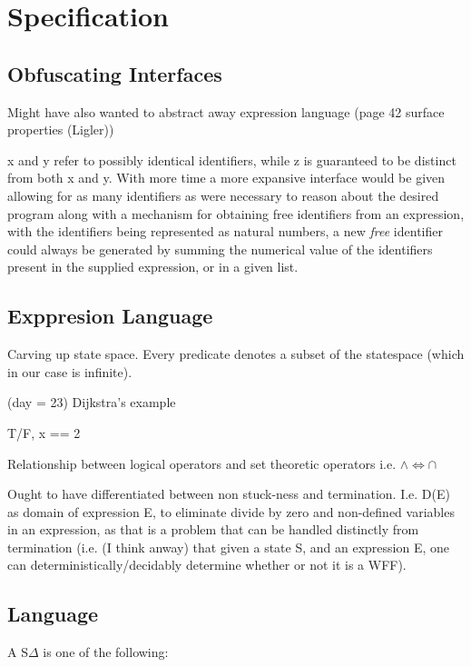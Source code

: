 \documentclass[oneside,12pt]{article}
\begin{document}
\section{Specification}

\subsection{Obfuscating Interfaces}

Might have also wanted to abstract away expression language
(page 42 surface properties (Ligler))


x and y refer to possibly identical identifiers, while z is guaranteed to be distinct from both x and y. With more time a more expansive interface would be given allowing for as many identifiers as were necessary to reason about the desired program along with a mechanism for obtaining free identifiers from an expression, with the identifiers being represented as natural numbers, a new \emph{free} identifier could always be generated by summing the numerical value of the identifiers present in the supplied expression, or in a given list.

\subsection{Exppresion Language}

Carving up state space.
Every predicate denotes a subset of the statespace
(which in our case is infinite).

(day = 23) Dijkstra's example

T/F, x == 2

Relationship between logical operators and set theoretic operators
i.e. $\wedge \Leftrightarrow \cap$


Ought to have differentiated between non stuck-ness and termination. I.e. D(E) as domain of expression E, to eliminate divide by zero and non-defined variables in an expression, as that is a problem that can be handled distinctly from termination
(i.e. (I think anway) that given a state S, and an expression E, one can deterministically/decidably determine whether or not it is a WFF).



\subsection{Language}

A S$\Delta$ is one of the following:
\end{document}
